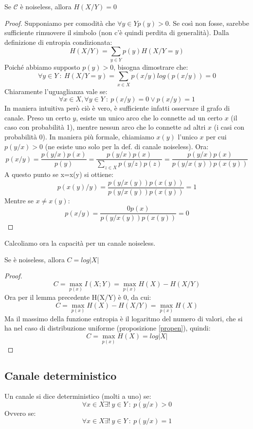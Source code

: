 \begin{lemma}
 Se $\mathcal{C}$ è noiseless, allora $H(X/Y)=0$
 \begin{proof}
 Supponiamo per comodità
 che $\forall y \in Y p(y)>0$. Se così non fosse, sarebbe sufficiente rimuovere il simbolo (non c'è quindi perdita di generalità).
 Dalla definizione di entropia condizionata:
 \[
  H(X/Y)=\sum_{y \in Y} p(y)H(X/Y=y)
 \]
 Poiché abbiamo supposto $p(y)>0$, bisogna dimostrare che:
 \[
  \forall y \in Y \ : \ H(X/Y=y)=\sum_{x \in X}p(x/y) log( p(x/y)) =0
 \]
 Chiaramente l'uguaglianza vale se: 
 \[
  \forall x \in X, \forall y \in Y \ : \ p(x/y)=0 \lor p(x/y)=1
 \]
 In maniera intuitiva però ciò è vero, è sufficiente infatti osservare il grafo di canale. Preso un certo $y$, esiste un unico 
 arco che lo connette ad un certo $x$ (il caso con probabilità 1), mentre nessun arco che lo connette ad altri $x$ (i casi con 
 probabilità 0).
 In maniera più formale, chiamiamo $x(y)$ l'unico $x$ per cui $p(y/x)>0$ (ne esiste uno solo per la def. di canale noiseless).
 Ora:
 \[
  p(x/y)=\frac{p(y/x)p(x)}{p(y)}=\frac{p(y/x)p(x)}{ \displaystyle\sum_{z \in X} p(y/z)p(z)}=
  \frac{p(y/x)p(x)}{ p(y/x(y))p(x(y))}
 \]
 A questo punto se x=x(y) si ottiene:
 \[
  p(x(y)/y)=\frac{p(y/x(y))p(x(y))}{ p(y/x(y))p(x(y))}=1
 \]
 Mentre se $x\neq x(y)$:
 \[
  p(x/y)=\frac{0 p(x)}{ p(y/x(y))p(x(y))}=0
 \]
 \end{proof}
\end{lemma}

\noindent
Calcoliamo ora la capacità per un canale noiseless.

\begin{lemma}
Se  è noiseless, allora $C=log|X|$
\begin{proof}
 \[
  C=\max_{p(x)} I(X;Y)=\max_{p(x)} H(X)-H(X/Y)
 \]
 Ora per il lemma precedente H(X/Y) è 0, da cui:
 \[
  C=\max_{p(x)} H(X)-H(X/Y)=\max_{p(x)} H(X)
 \]
 Ma il massimo della funzione entropia è il logaritmo del numero di valori, che 
 si ha nel caso di distribuzione uniforme (proposizione \ref{propen}), quindi:
 \[
  C=\max_{p(x)} H(X)=log|X|
 \]
\end{proof}
\end{lemma}

\subsection{Canale deterministico}

\medskip

\begin{definizione}
 Un canale si dice deterministico (molti a uno) se:
\[
 \forall x \in X \exists ! \ y \in Y \ : \ p(y/x) > 0
\]
Ovvero se:
\[
 \forall x \in X \exists ! \ y \in Y \ : \ p(y/x)=1
\]
\end{definizione}

